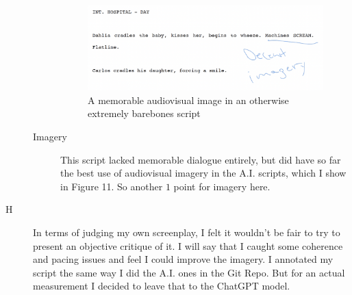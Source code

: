 \documentclass[sigconf]{acmart}
\begin{document}
\begin{description}
\begin{description}
        \begin{figure}[!hbt]
            \centering
            \includegraphics[width=0.8\linewidth]{images/ShortImagery.png}
            \caption{A memorable audiovisual image in an otherwise extremely barebones script}
            \label{fig:s-imagery}
        \end{figure}
        \item[Imagery] This script lacked memorable dialogue entirely, but did have so far the best use of audiovisual imagery in the A.I. scripts, which I show in Figure 11. So another $1$ point for imagery here.
    \end{description}
    \item[H] In terms of judging my own screenplay, I felt it wouldn't be fair to try to present an objective critique of it. I will say that I caught some coherence and pacing issues and feel I could improve the imagery. I annotated my script the same way I did the A.I. ones in the Git Repo. But for an actual measurement I decided to leave that to the ChatGPT model.
\end{description}
\end{document}

